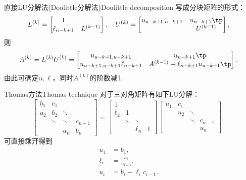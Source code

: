 \begin{theorem}
    {直接LU分解法(Doolittle分解法)}{Doolittle decomposition}
    写成分块矩阵的形式：
    \[
        L^{(k)}=\begin{bmatrix}
            1\\\ell_{n-k+1}&L^{(k-1)}
        \end{bmatrix},\quad
        U^{(k)}=\begin{bmatrix}
            u_{u-k+1,u-k+1}&u_{u-k+1}\tp\\ &U^{(k-1)}
        \end{bmatrix},
    \]
    则
    \[
        A^{(k)}=L^{(k)}U^{(k)}=\begin{bmatrix}
            u_{u-k+1,u-k+1}&u_{u-k+1}\tp\\
            u_{u-k+1,u-k+1}\ell_{n-k+1}&A^{(k-1)}+\ell_{n-k+1}u_{u-k+1}\tp
        \end{bmatrix}.
    \]
    由此可确定$u,\ell$，同时$A^{(k)}$的阶数减1.
\end{theorem}

\begin{theorem}
    {Thomas方法}{Thomas technique}
    对于三对角矩阵有如下LU分解：
    \[
        \begin{bmatrix}
        b_1&c_1\\a_2&b_2&\ddots\\ &\ddots&\ddots&c_{n-1}\\ &&a_n&b_n
        \end{bmatrix}=\begin{bmatrix}
            1\\\ell_2&1\\&\ddots&\ddots\\ &&\ell_n&1
        \end{bmatrix}\begin{bmatrix}
            u_1&c_1\\ &u_2&\ddots\\ &&\ddots&c_{n-1}\\ &&&u_n
        \end{bmatrix},
    \]
    可直接乘开得到
    \begin{subequations}
        \begin{align}
            u_1&=b_1,\\
            \ell_i&=\frac{a_i}{u_{i-1}},\\
            u_i&=b_i-\ell_ic_{i-1}.
        \end{align}
    \end{subequations}
\end{theorem}
    
